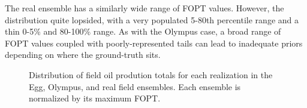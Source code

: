 The real ensemble has a similarly wide range of FOPT values.
However, the distribution quite lopsided, with a very populated 5-80th percentile range and a thin 0-5\% and 80-100\% range.
As with the Olympus case, a broad range of FOPT values coupled with poorly-represented tails can lead to inadequate priors depending on where the ground-truth sits.
%
\begin{figure}[htbp]
    \centering
    \caption{%
        Distribution of field oil prodution totals for each realization in the Egg, Olympus, and     real field ensembles.
        Each ensemble is normalized by its maximum FOPT.
    }
    \label{fig:opt-cdf-all}
    
\end{figure}